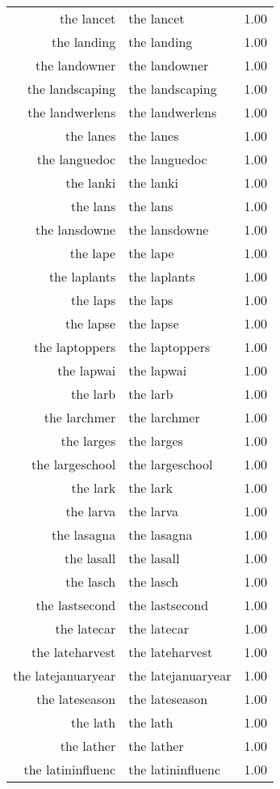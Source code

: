 \begin{table}[ht]
\begin{tabular}{rlr}
  the lancet & the lancet & 1.00 \\ 
  the landing & the landing & 1.00 \\ 
  the landowner & the landowner & 1.00 \\ 
  the landscaping & the landscaping & 1.00 \\ 
  the landwerlens & the landwerlens & 1.00 \\ 
  the lanes & the lanes & 1.00 \\ 
  the languedoc & the languedoc & 1.00 \\ 
  the lanki & the lanki & 1.00 \\ 
  the lans & the lans & 1.00 \\ 
  the lansdowne & the lansdowne & 1.00 \\ 
  the lape & the lape & 1.00 \\ 
  the laplants & the laplants & 1.00 \\ 
  the laps & the laps & 1.00 \\ 
  the lapse & the lapse & 1.00 \\ 
  the laptoppers & the laptoppers & 1.00 \\ 
  the lapwai & the lapwai & 1.00 \\ 
  the larb & the larb & 1.00 \\ 
  the larchmer & the larchmer & 1.00 \\ 
  the larges & the larges & 1.00 \\ 
  the largeschool & the largeschool & 1.00 \\ 
  the lark & the lark & 1.00 \\ 
  the larva & the larva & 1.00 \\ 
  the lasagna & the lasagna & 1.00 \\ 
  the lasall & the lasall & 1.00 \\ 
  the lasch & the lasch & 1.00 \\ 
  the lastsecond & the lastsecond & 1.00 \\ 
  the latecar & the latecar & 1.00 \\ 
  the lateharvest & the lateharvest & 1.00 \\ 
  the latejanuaryear & the latejanuaryear & 1.00 \\ 
  the lateseason & the lateseason & 1.00 \\ 
  the lath & the lath & 1.00 \\ 
  the lather & the lather & 1.00 \\ 
  the latininfluenc & the latininfluenc & 1.00 \\ 

\end{tabular}
\end{table}
